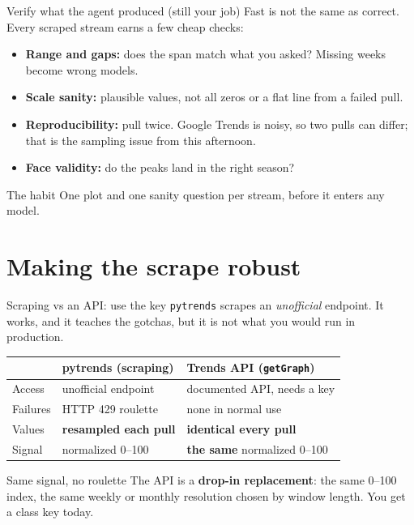 \documentclass[aspectratio=169,11pt]{beamer}
\begin{document}
\begin{frame}{Verify what the agent produced (still your job)}
  Fast is not the same as correct. Every scraped stream earns a few cheap checks:
  \begin{itemize}
    \item \textbf{Range and gaps:} does the span match what you asked? Missing weeks become
          wrong models.
    \item \textbf{Scale sanity:} plausible values, not all zeros or a flat line from a
          failed pull.
    \item \textbf{Reproducibility:} pull twice. Google Trends is noisy, so two pulls can
          differ; that is the sampling issue from this afternoon.
    \item \textbf{Face validity:} do the peaks land in the right season?
  \end{itemize}
  \vspace{0.3em}
  \begin{alertblock}{The habit}
    One plot and one sanity question per stream, before it enters any model.
  \end{alertblock}
\end{frame}

\section{Making the scrape robust}

\begin{frame}{Scraping vs an API: use the key}
  \texttt{pytrends} scrapes an \emph{unofficial} endpoint. It works, and it teaches the
  gotchas, but it is not what you would run in production.
  \begin{center}
  \footnotesize
  \begin{tabular}{lll}
    \hline
     & \textbf{pytrends (scraping)} & \textbf{Trends API (\texttt{getGraph})} \\
    \hline
    Access      & unofficial endpoint      & documented API, needs a key \\
    Failures    & HTTP 429 roulette        & none in normal use \\
    Values      & \textbf{resampled each pull} & \textbf{identical every pull} \\
    Signal      & normalized 0--100        & \textbf{the same} normalized 0--100 \\
    \hline
  \end{tabular}
  \end{center}
  \vspace{0.3em}
  \begin{alertblock}{Same signal, no roulette}
    The API is a \textbf{drop-in replacement}: the same 0--100 index, the same weekly or
    monthly resolution chosen by window length. You get a class key today.
  \end{alertblock}
\end{frame}
\end{document}
